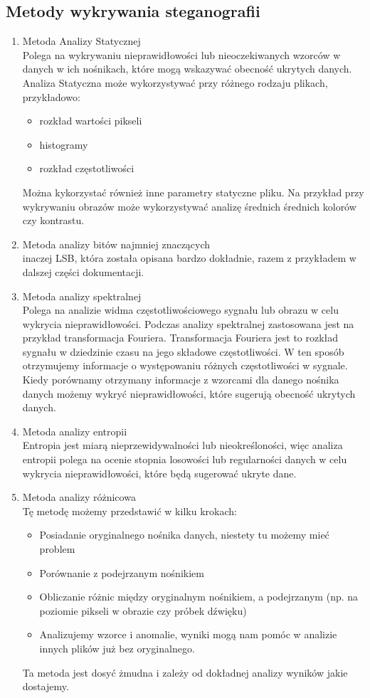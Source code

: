 \documentclass{article}
\begin{document}
\subsection{Metody wykrywania steganografii}
\begin{enumerate}
	\item Metoda Analizy Statycznej\\
Polega na wykrywaniu nieprawidłowości lub nieoczekiwanych wzorców w danych w ich nośnikach, które mogą wskazywać obecność ukrytych danych. Analiza Statyczna może wykorzystywać przy różnego rodzaju plikach, przykładowo:
        \begin{itemize}
            \item rozkład wartości pikseli
            \item histogramy
            \item rozkład częstotliwości
        \end{itemize}
Można kykorzystać również inne parametry statyczne pliku. Na przykład przy wykrywaniu obrazów może wykorzystywać analizę średnich średnich kolorów czy kontrastu.
        \item Metoda analizy bitów najmniej znaczących\\
        inaczej LSB, która została opisana bardzo dokładnie, razem z przykładem w dalszej części dokumentacji.
        \item Metoda analizy spektralnej\\
Polega na analizie widma częstotliwościowego sygnału lub obrazu w celu wykrycia nieprawidłowości. Podczas analizy spektralnej zastosowana jest na przykład transformacja Fouriera. Transformacja Fouriera jest to rozkład sygnału w dziedzinie czasu na jego składowe częstotliwości. W ten sposób otrzymujemy informacje o występowaniu różnych częstotliwości w sygnale. Kiedy porównamy otrzymany informacje z wzorcami dla danego nośnika danych możemy wykryć nieprawidłowości, które sugerują obecność ukrytych danych.
        \item Metoda analizy entropii\\
Entropia jest miarą nieprzewidywalności lub nieokreśloności, więc analiza entropii polega na ocenie stopnia losowości lub regularności danych w celu wykrycia nieprawidłowości, które będą sugerować ukryte dane.
        \item Metoda analizy różnicowa\\
Tę metodę możemy przedstawić w kilku krokach:
        \begin{itemize}
            \item Posiadanie oryginalnego nośnika danych, niestety tu możemy mieć problem
            \item Porównanie z podejrzanym nośnikiem
            \item Obliczanie różnic między oryginalnym nośnikiem, a podejrzanym (np. na poziomie pikseli w obrazie czy próbek dźwięku)
            \item Analizujemy wzorce i anomalie, wyniki mogą nam pomóc w analizie innych plików już bez oryginalnego.
        \end{itemize}
Ta metoda jest dosyć żmudna i zależy od dokładnej analizy wyników jakie dostajemy.
\end{enumerate}
\end{document}
